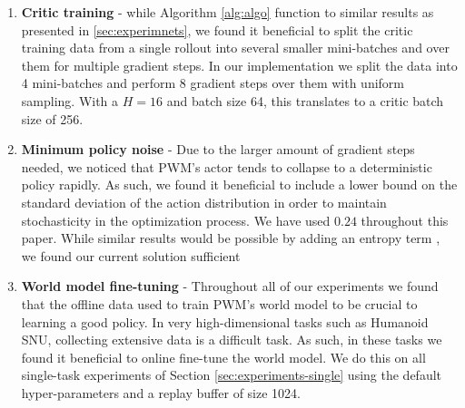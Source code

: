 \begin{enumerate}
    \item \textbf{Critic training} - while Algorithm \ref{alg:algo} function to similar results as presented in \ref{sec:experimnets}, we found it beneficial to split the critic training data from a single rollout into several smaller mini-batches and over them for multiple gradient steps. In our implementation we split the data into 4 mini-batches and perform 8 gradient steps over them with uniform sampling. With a $H=16$ and batch size 64, this translates to a critic batch size of 256.
    \item \textbf{Minimum policy noise} - Due to the larger amount of gradient steps needed, we noticed that PWM's actor tends to collapse to a deterministic policy rapidly. As such, we found it beneficial to include a lower bound on the standard deviation of the action distribution in order to maintain stochasticity in the optimization process. We have used $0.24$ throughout this paper. While similar results would be possible by adding an entropy term \citep{schulman2017proximal}, we found our current solution sufficient
    \item \textbf{World model fine-tuning} - Throughout all of our experiments we found that the offline data used to train PWM's world model to be crucial to learning a good policy. In very high-dimensional tasks such as Humanoid SNU, collecting extensive data is a difficult task. As such, in these tasks we found it beneficial to online fine-tune the world model. We do this on all single-task experiments of Section \ref{sec:experiments-single} using the default hyper-parameters and a replay buffer of size 1024.
    
\end{enumerate}


